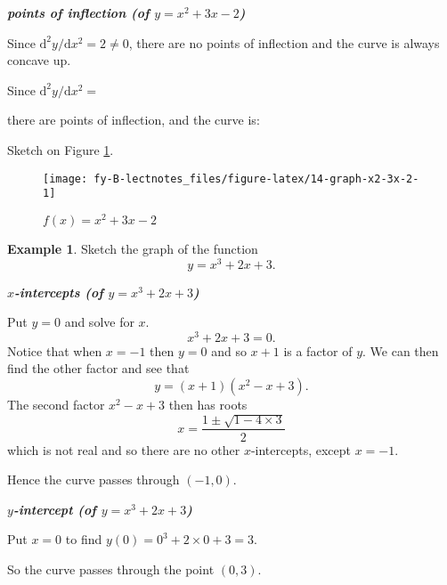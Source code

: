 \documentclass[
  english,
  11pt,
  oneside]{book}
\newcommand{\slide}{}
\theoremstyle{definition}
\theoremstyle{definition}
\newtheorem{example}{Example}[chapter]
\theoremstyle{definition}
\theoremstyle{definition}
\theoremstyle{remark}
\begin{document}
\slide

\textbf{\emph{points of inflection (of \(y = x^2+3x-2\))}}

\begin{notslides}

Since \(\mathrm{d}^2y/\mathrm{d}x^2 = 2\ne0\), there are no points of inflection
and the curve is always concave up.

\end{notslides}

\begin{slidesonly}

Since \(\mathrm{d}^2y/\mathrm{d}x^2 =\)

there are \phantom{nonono} points of inflection, and the curve is:
\vfill

\end{slidesonly}

Sketch on Figure \ref{fig:14-graph-x2-3x-2}.

\begin{figure}

{\centering \texttt{[image: fy-B-lectnotes\_files/figure-latex/14-graph-x2-3x-2-1]} 

}

\caption{$f(x)=x^2+3x-2$}\label{fig:14-graph-x2-3x-2}
\end{figure}
\slide

\begin{example}
Sketch the graph of the function
\[
y = x^3+2x+3.
\]
\end{example}

\textbf{\emph{\(x\)-intercepts (of \(y = x^3+2x+3\))}}

\begin{notslides}

Put \(y=0\) and solve for \(x\).
\[
x^3+2x+3 = 0.
\]
Notice that when \(x=-1\) then \(y=0\) and so \(x+1\) is a factor of \(y\). We can then find the other factor and see that
\[
y = (x+1)(x^2-x+3).
\]
The second factor \(x^2-x+3\) then has roots
\[
x = \frac{1\pm\sqrt{1-4\times3}}{2}
\]
which is not real and so there are no other \(x\)-intercepts, except \(x=-1\).

Hence the curve passes through \((-1,0)\).

\end{notslides}

\slide

\textbf{\emph{\(y\)-intercept (of \(y = x^3+2x+3\))}}

\begin{notslides}

Put \(x=0\) to find \(y(0) = 0^3+2\times0+3 = 3\).

So the curve passes through the point \((0,3)\).

\end{notslides}
\end{document}
